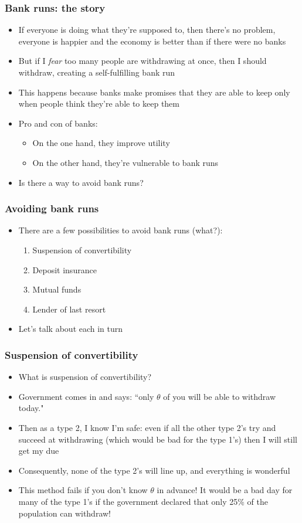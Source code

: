 \documentclass{beamer}
\begin{document}
\begin{frame}
\frametitle{Bank runs: the story}
\begin{itemize}
\item If everyone is doing what they're supposed to, then there's no problem, everyone is happier and the economy is better than if there were no banks
\bigskip
\item But if I \emph{fear} too many people are withdrawing at once, then I should withdraw, creating a self-fulfilling bank run
\bigskip
\item This happens because banks make promises that they are able to keep only when people think they're able to keep them
\bigskip
\item Pro and con of banks:
\begin{itemize}
\item On the one hand, they improve utility
\bigskip
\item On the other hand, they're vulnerable to bank runs
\end{itemize}
\item Is there a way to avoid bank runs?
\end{itemize}
\end{frame}

\begin{frame}
\frametitle{Avoiding bank runs}
\begin{itemize}
\item There are a few possibilities to avoid bank runs (what?):
\bigskip
\begin{enumerate}
\item<2-> Suspension of convertibility
\bigskip
\item<3-> Deposit insurance
\bigskip
\item<4-> Mutual funds
\bigskip
\item<5->  Lender of last resort
\bigskip
\end{enumerate}
\item<5-> Let's talk about each in turn
\end{itemize}
\end{frame}

\begin{frame}
\frametitle{Suspension of convertibility}
\begin{itemize}
\item<1-> What is suspension of convertibility?
\bigskip
\item<2-> Government comes in and says: ``only $\theta$ of you will be able to withdraw today."  
\bigskip
\item<3-> Then as a type 2, I know I'm safe:  even if all the other type 2's try and succeed at withdrawing (which would be bad for the type 1's) then I will still get my due
\bigskip
\item<4-> Consequently, none of the type 2's will line up, and everything is wonderful
\bigskip
\item<5-> This method fails if you don't know $\theta$ in advance!  It would be a bad day for many of the type 1's if the government declared that only 25\% of the population can withdraw!
\end{itemize}
\end{frame}
\end{document}
